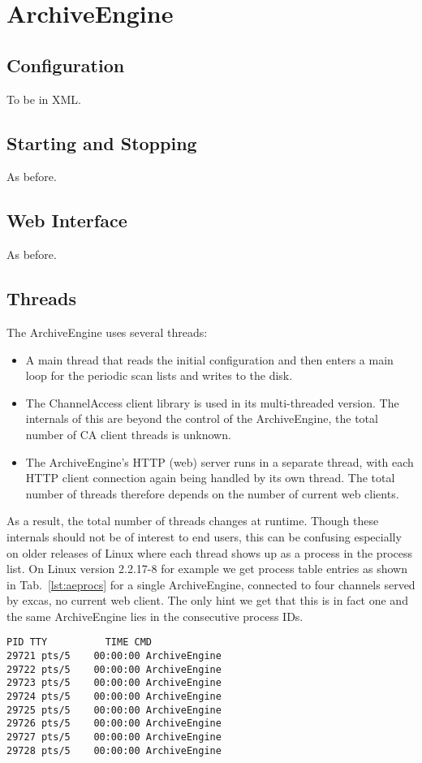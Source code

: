 \chapter{ArchiveEngine}

\section{Configuration}
To be in XML.

\section{Starting and Stopping}
As before.

\section{Web Interface}
As before.

\section{Threads}
The ArchiveEngine uses several threads:
\begin{itemize}
\item A main thread that reads the initial configuration and then
  enters a main loop for the periodic scan lists and writes to the
  disk.
\item The ChannelAccess client library is used in its multi-threaded
  version. The internals of this are beyond the control of the
  ArchiveEngine, the total number of CA client threads is unknown.
\item The ArchiveEngine's HTTP (web) server runs in a separate thread,
  with each HTTP client connection again being handled by its own
  thread. The total number of threads therefore depends on the number
  of current web clients.
\end{itemize}
As a result, the total number of threads changes at runtime. Though
these internals should not be of interest to end users, this can be
confusing especially on older releases of Linux where each thread
shows up as a process in the process list.
On Linux version 2.2.17-8 for example we get process table entries as
shown in Tab.~\ref{lst:aeprocs} for a single ArchiveEngine, connected
to four channels served by excas, no current web client. The only hint
we get that this is in fact one and the same ArchiveEngine lies in the
consecutive process IDs.

\begin{lstlisting}[float=htb,
caption={Output of Linux 'ps' process list command, see text.},
label=lst:aeprocs]
  PID TTY          TIME CMD
29721 pts/5    00:00:00 ArchiveEngine
29722 pts/5    00:00:00 ArchiveEngine
29723 pts/5    00:00:00 ArchiveEngine
29724 pts/5    00:00:00 ArchiveEngine
29725 pts/5    00:00:00 ArchiveEngine
29726 pts/5    00:00:00 ArchiveEngine
29727 pts/5    00:00:00 ArchiveEngine
29728 pts/5    00:00:00 ArchiveEngine   
\end{lstlisting}

